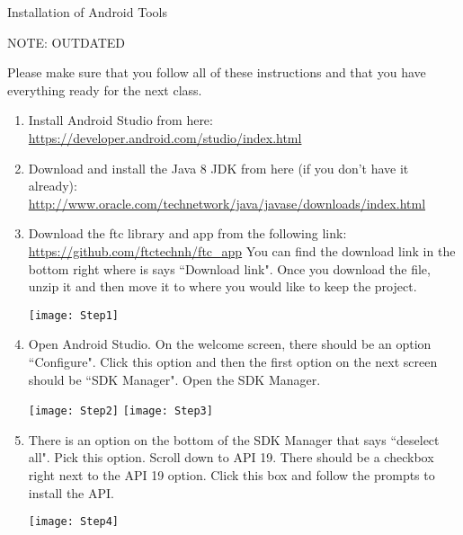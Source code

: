 \documentclass[11pt,fleqn]{article}
\begin{document}
\begin{center}
{\Huge
Installation of Android Tools
}\\
\end{center}
NOTE: OUTDATED

Please make sure that you follow all of these instructions and that you have
everything ready for the next class.

\begin{enumerate}[1.]
\item
Install Android Studio from here: \newline
\url{https://developer.android.com/studio/index.html}
 
\item
    Download and install the Java 8 JDK from here (if you don't have it already):\newline
\url{http://www.oracle.com/technetwork/java/javase/downloads/index.html}

\item
Download the ftc library and app from the following link:\newline
\url{https://github.com/ftctechnh/ftc_app}\newline
You can find the download link in the bottom right where is says ``Download
link". Once you download the file, unzip it and then move it to where you would
like to keep the project. 

\begin{center}
\texttt{[image: Step1]}
\end{center}

\item
Open Android Studio. On the welcome screen, there should be an option
``Configure". Click this option and then the first option on the next screen
should be ``SDK Manager". Open the SDK Manager. 

\begin{center}
\texttt{[image: Step2]}
\texttt{[image: Step3]}
\end{center}

\item
There is an option on the bottom of the SDK Manager that says ``deselect all".
Pick this option. Scroll down to API 19. There should be a checkbox right next
to the API 19 option. Click this box and follow the prompts to install the API. 

\begin{center}
\texttt{[image: Step4]}
\end{center}


\end{enumerate}
\end{document}

